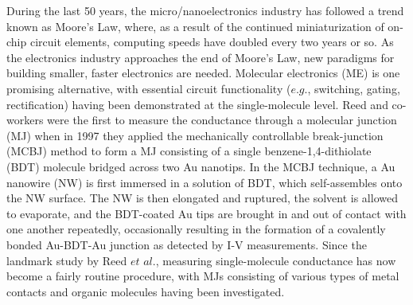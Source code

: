 \documentclass[10pt]{report}  %
\newcommand\findent{\hspace*{\parindent}}
\begin{document}
\findent During the last 50 years, the micro/nanoelectronics industry has followed a trend known as Moore's Law, where, as a result of the continued miniaturization of on-chip circuit elements, computing speeds have doubled every two years or so. \cite{Moore:1965} As the electronics industry approaches the end of Moore's Law,\cite{Zhirnov:2003} new paradigms for building smaller, faster electronics are needed.  Molecular electronics (ME)  is one promising alternative, with essential circuit functionality ($e.g.$, switching,\cite{Lortscher:2006} gating,\cite{Song:2009} rectification\cite{Diez-Perez:2009}) having been demonstrated at the single-molecule level. Reed and co-workers\cite{Reed:1997} were the first to measure the conductance through a molecular junction (MJ)  when in 1997 they applied the mechanically controllable break-junction (MCBJ) method to form a MJ consisting of a single benzene-1,4-dithiolate (BDT)  molecule bridged across two Au nanotips. In the MCBJ technique, a Au nanowire (NW)  is first immersed in a solution of BDT, which self-assembles onto the NW surface. The NW is then elongated and ruptured, the solvent is allowed to evaporate, and the BDT-coated Au tips are brought in and out of contact with one another repeatedly, occasionally resulting in the formation of a covalently bonded Au-BDT-Au junction as detected by I-V measurements. Since the landmark study by Reed $et$ $al.$,\cite{Reed:1997} measuring single-molecule conductance has now become a fairly routine procedure, with MJs consisting of various types of metal contacts and organic molecules having been investigated.\cite{Kergueris:1999,Weber:2002,Gonzalez:2006,Lortscher:2006,Ulrich:2006,Tsutsui:2006,Lortscher:2007,Wu:2008,Tsutsui:2008,Teramae:2008,Tsutsui:2009,Tsutsui:2009-nanoscale,Horiguchi:2009,Taniguchi:2009,Zotti:2010,Yokota:2010,Kim:2011,Xiao:2004,Venkataraman-nature:2006,Venkataraman:2006,Huang:2007,Fujii:2008,Li:2008,Diez-Perez:2009,Lu:2009,Kamenetska:2009,Mishchenko:2010,Zhou:2010,Xing:2010,Schneebeli:2011,Fatemi:2011,Meisner:2011,Guo-jacs:2011,Leary:2011,Li:2011,Arroyo:2011,Cheng:2011,Kiguchi:2012,Bruot:2012,Cui:2001,Beebe:2002,Frei:2011,Frei:2012,Song:2009,Haiss:2003,Haiss:2006,Haiss:2008,Haiss:2009,Leary:2009,Kay:2011} 
\end{document}
